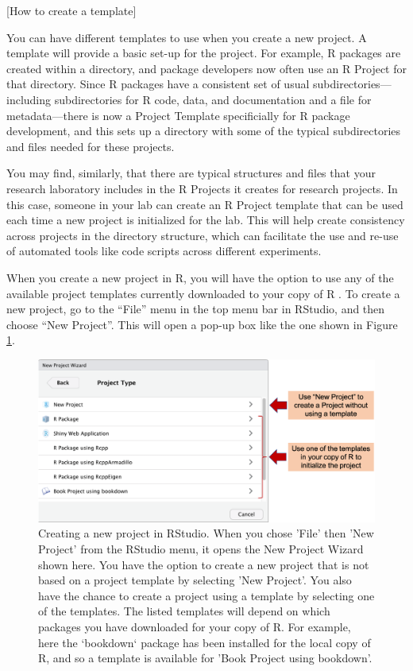\documentclass[]{tufte-book}
\begin{document}
{[}How to create a template{]}

You can have different templates to use when you create a new project. A
template will provide a basic set-up for the project. For example, R packages
are created within a directory, and package developers now often use an R
Project for that directory. Since R packages have a consistent set of usual
subdirectories---including subdirectories for R code, data, and documentation
and a file for metadata---there is now a Project Template specificially for R
package development, and this sets up a directory with some of the typical
subdirectories and files needed for these projects.

You may find, similarly, that there are typical structures and files that your
research laboratory includes in the R Projects it creates for research projects.
In this case, someone in your lab can create an R Project template that can
be used each time a new project is initialized for the lab. This will help
create consistency across projects in the directory structure, which can
facilitate the use and re-use of automated tools like code scripts across
different experiments.

When you create a new project in R, you will have the option to use any of
the available project templates currently downloaded to your copy of R
\citep{rstudioprojecttemplate}. To create a new project, go to the ``File'' menu
in the top menu bar in RStudio, and then choose ``New Project''. This will open
a pop-up box like the one shown in Figure \ref{fig:createnewproject}.

\begin{figure}
\includegraphics[width=\textwidth]{figures/create_new_project} \caption[Creating a new project in RStudio]{Creating a new project in RStudio. When you chose 'File' then 'New Project' from the RStudio menu, it opens the New Project Wizard shown here. You have the option to create a new project that is not based on a project template by selecting 'New Project'. You also have the chance to create a project using a template by selecting one of the templates. The listed templates will depend on which packages you have downloaded for your copy of R. For example, here the `bookdown` package has been installed for the local copy of R, and so a template is available for 'Book Project using bookdown'.}\label{fig:createnewproject}
\end{figure}
\end{document}
